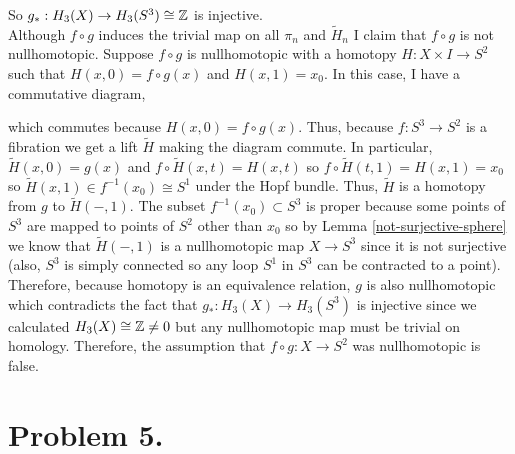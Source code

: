 \documentclass[12pt]{extarticle}
\begin{document}
\begin{center}
\end{center}
So $g_* : H_3(X) \to H_3(S^3) \cong \mathbb{Z}$ is injective. 
\bigskip\\
Although $f \circ g$ induces the trivial map on all $\pi_n$ and $\tilde{H}_n$ I claim that $f \circ g$ is not nullhomotopic. Suppose $f \circ g$ is nullhomotopic with a homotopy $H : X \times I \to S^2$ such that $H(x, 0) = f \circ g(x)$ and $H(x, 1) = x_0$. In this case, I have a commutative diagram,
\begin{center}
\end{center}
which commutes because $H(x, 0) = f \circ g(x)$. Thus, because $f : S^3 \to S^2$ is a fibration we get a lift $\tilde{H}$ making the diagram commute. In particular, $\tilde{H}(x,0) = g(x)$ and $f \circ \tilde{H}(x, t) = H(x, t)$ so $f \circ \tilde{H}(t, 1) = H(x, 1) = x_0$ so $\tilde{H}(x, 1) \in f^{-1}(x_0) \cong S^1$ under the Hopf bundle. Thus, $\tilde{H}$ is a homotopy from $g$ to $\tilde{H}(-,1)$. The subset $f^{-1}(x_0) \subset S^3$ is proper because some points of $S^3$ are mapped to points of $S^2$ other than $x_0$ so by Lemma \ref{not-surjective-sphere} we know that $\tilde{H}(-, 1)$ is a nullhomotopic map $X \to S^3$ since it is not surjective (also, $S^3$ is simply connected so any loop $S^1$ in $S^3$ can be contracted to a point). Therefore, because homotopy is an equivalence relation, $g$ is also nullhomotopic which contradicts the fact that $g_* : H_3(X) \to H_3(S^3)$ is injective since we calculated $H_3(X) \cong \mathbb{Z} \neq 0$ but any nullhomotopic map must be trivial on homology. Therefore, the assumption that $f \circ g : X \to S^2$ was nullhomotopic is false.     

\section*{Problem 5.}
\end{document}
